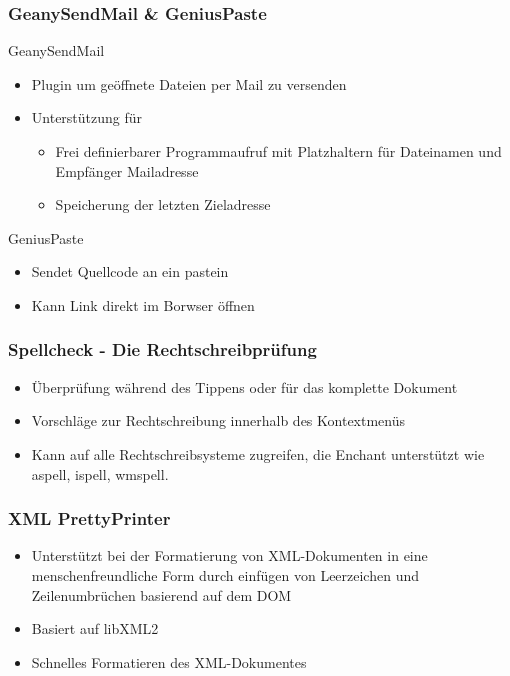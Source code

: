 \begin{frame}
  \frametitle{GeanySendMail \& GeniusPaste}
  \begin{block}{GeanySendMail}
    \begin{itemize}
      \item Plugin um geöffnete Dateien per Mail zu versenden
      \item Unterstützung für
        \begin{itemize}
        \item Frei definierbarer Programmaufruf mit Platzhaltern für
          Dateinamen und Empfänger Mailadresse
        \item Speicherung der letzten Zieladresse
        \end{itemize}
    \end{itemize}
  \end{block}
  \begin{block}{GeniusPaste}
	\begin{itemize}
		\item Sendet Quellcode an ein pastein
		\item Kann Link direkt im Borwser öffnen
	\end{itemize}
  \end{block}
\end{frame}

\begin{frame}
  \frametitle{Spellcheck - Die Rechtschreibprüfung}
  \begin{block}{}
    \begin{itemize}
    \item Überprüfung während des Tippens oder für das komplette
      Dokument
    \item Vorschläge zur Rechtschreibung innerhalb des Kontextmenüs
    \item Kann auf alle Rechtschreibsysteme zugreifen, die Enchant
      unterstützt wie aspell, ispell, wmspell.
    \end{itemize}
  \end{block}
\end{frame}

\begin{frame}
    \frametitle{XML PrettyPrinter}
    \begin{block}{}
    \begin{itemize}
        \item Unterstützt bei der Formatierung von XML-Dokumenten
              in eine menschenfreundliche Form durch einfügen von
              Leerzeichen und Zeilenumbrüchen basierend auf dem DOM
        \item Basiert auf libXML2
        \item Schnelles Formatieren des XML-Dokumentes
    \end{itemize}
    \end{block}
\end{frame}

